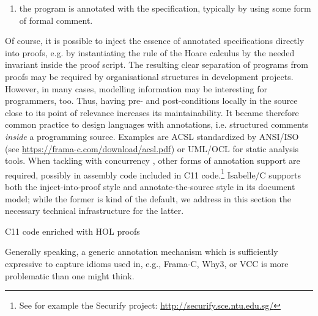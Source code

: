 \begin{isabellebody}
\begin{isamarkuptext}
\begin{enumerate}
\item the program is annotated with the specification, typically by using some form of formal
comment.%
\end{enumerate}%
\end{isamarkuptext}\isamarkuptrue%
%
\begin{isamarkuptext}%
Of course, it is possible to inject the essence of annotated specifications directly
into proofs, e.g. by instantiating the  rule of the Hoare calculus by the needed
invariant inside the proof script. The resulting clear separation of programs from proofs may be
required by organisational structures in development projects. However, in many cases, modelling
information may be interesting for programmers, too. Thus, having pre- and post-conditions locally
in the source close to its point of relevance increases its maintainability. It became therefore
common practice to design languages with annotations, i.e. structured comments
\emph{inside} a programming source. Examples are ACSL standardized by ANSI/ISO (see
\url{https://frama-c.com/download/acsl.pdf}) or UML/OCL \cite{DBLP:journals/afp/BruckerTW14} for static analysis tools. When tackling with concurrency \cite{DBLP:conf/tacas/SananZHZTL17}, other forms of annotation support are required, possibly in
assembly code included in C11 code.\footnote{See for example the Securify project:
  \url{http://securify.sce.ntu.edu.sg/}} Isabelle/C supports both the
inject-into-proof style and annotate-the-source style in its document model; while the former is
kind of the default, we address in this section the necessary technical infrastructure for the
latter.%
\end{isamarkuptext}\isamarkuptrue%
%
\isadelimdocument
%
\endisadelimdocument
%
\isatagdocument
%
\isamarkuptrue%
%
\endisatagdocument
{\isafolddocument}%
%
\isadelimdocument
%
\endisadelimdocument
%
\begin{isamarkupfigure*}%
[label = {C-sample6},type = {Isa_COL.figure}, args={label = {C-sample6},type = {Isa_COL.figure}, Isa_COL.figure.relative_width = {56}, Isa_COL.figure.src = {figures/A-C-Source6}, Isa_COL.figure.spawn_columns = {True}}]C11 code enriched with HOL proofs%
\end{isamarkupfigure*}\isamarkuptrue%
%
\begin{isamarkuptext}%
Generally speaking, a generic annotation mechanism which is sufficiently expressive to
capture idioms used in, e.g., Frama-C, Why3, or VCC is more problematic than one might think.

\end{isamarkuptext}
\end{isabellebody}

